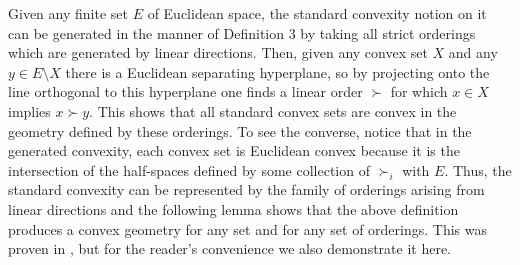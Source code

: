 \documentclass[12pt]{elsarticle}
\theoremstyle{plain}
\theoremstyle{definition}
\begin{document}


Given any finite set $E$ of Euclidean space, the standard convexity notion on it can be  generated in the manner of Definition 3 by taking all strict orderings which are generated by linear directions. Then, given any convex set $X$ and any $y\in E\setminus X$ there is a Euclidean separating hyperplane, so by projecting onto the line orthogonal to this hyperplane one finds a linear order $\succ$ for which $x\in X$ implies $x\succ y$. This shows that all standard convex sets are convex in the geometry defined by these orderings. To see the converse, notice that in the generated convexity, each convex set is Euclidean convex because it is the intersection of the half-spaces defined by some collection of $\succ_i$ with $E$. Thus, the standard convexity can be represented by the family of orderings arising from linear directions and the following lemma shows that the above definition produces a convex geometry for any set and for any set of orderings. This was proven in \cite{EJ}, but for the reader's convenience we also demonstrate it here.
	
\end{document}
